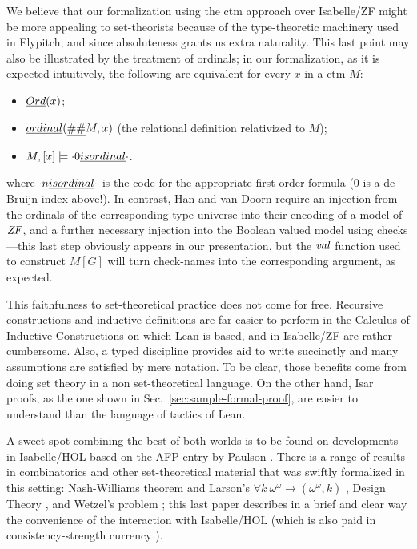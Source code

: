 We believe that our formalization using the ctm approach
over Isabelle/ZF might be more appealing to set-theorists because of the
type-theoretic machinery used in Flypitch, and %
since absoluteness grants us extra naturality. This last point may also
be illustrated by the treatment of ordinals; in our formalization, as
it is expected intuitively, the following are equivalent for every $x$
in a ctm $M$:
\begin{itemize}
\item $\isa{Ord}(x)$;
\item $\isa{ordinal}(\isa{\#\#}M,x)$ (the relational
  definition relativized to $M$);
\item
  $M,[x] \models {\cdot}0\isa{ is ordinal}{\cdot}$.
\end{itemize}
where ${\cdot}n\isa{ is ordinal}{\cdot}$ is the code for the
appropriate first-order formula  ($0$ is a de
Bruijn index above!). In contrast, Han and van Doorn require an
injection from the ordinals of the corresponding type universe into
their encoding of a model of $\mathit{ZF}$, and a further necessary injection into the Boolean
valued model using checks---this last step obviously appears in our
presentation, but the $\operatorname{\mathit{val}}$ function used to construct $M[G]$ will turn
check-names into the corresponding argument, as expected.

This faithfulness to set-theoretical practice does not come for
free. Recursive constructions and inductive definitions are far easier
to perform in the Calculus of Inductive Constructions on which Lean
is based, and in Isabelle/ZF are rather cumbersome. Also, a
typed discipline provides aid to write succinctly and many assumptions
are satisfied by mere notation. To be clear, those benefits come from
doing set theory in a non set-theoretical language. On the other
hand, Isar proofs, as the one shown in
Sec.~\ref{sec:sample-formal-proof}, are easier to understand
than the language of tactics of Lean.

A sweet spot combining the best of both worlds is to be found on
developments in Isabelle/HOL based on the AFP entry
 by Paulson \cite{ZFC_in_HOL-AFP}. There is a
range of results in combinatorics and other set-theoretical material
that was swiftly formalized in this setting: Nash-Williams theorem and
Larson's $\forall k\ \omega^{\omega}\longrightarrow(\omega^\omega,k)$
\cite{doi:10.1080/10586458.2021.1980464}, Design Theory
\cite{10.1007/978-3-030-81097-9_1}, and Wetzel's problem
\cite{2022arXiv220503159P}; this last paper describes in a brief and
clear way the convenience of the interaction with Isabelle/HOL
(which is also paid in consistency-strength currency
\cite[Sect.~3]{DBLP:conf/ictac/Obua06}).

